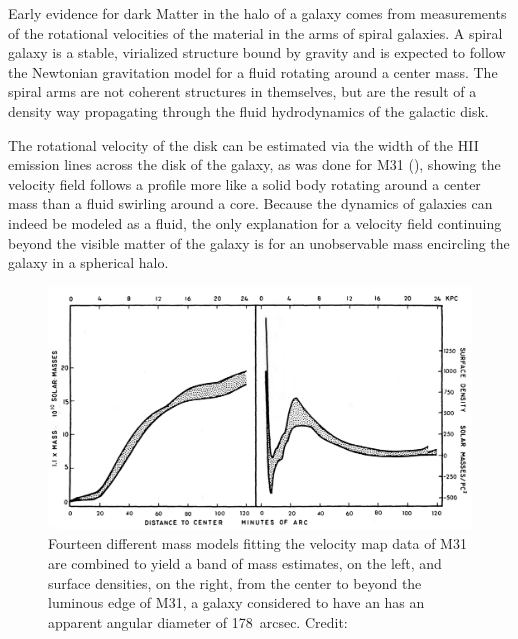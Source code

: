 \documentclass{paper}
\begin{document}
  Early evidence for dark Matter in the halo of a galaxy comes from
  measurements of the rotational velocities of the material in the arms of
  spiral galaxies. A spiral galaxy is a stable, virialized structure bound by
  gravity and is expected to follow the Newtonian gravitation model for a
  fluid rotating around a center mass. The spiral arms are not coherent
  structures in themselves, but are the result of a density way propagating 
  through the fluid hydrodynamics of the galactic disk. 

  The rotational velocity of the disk can be estimated via the 
  width of the HII emission lines across the disk of the galaxy, as was done
  for M31 (\cite{1970ApJ...159..379R}), showing the velocity field follows a 
  profile more like a solid body rotating around a center mass than a fluid 
  swirling around a core. Because the dynamics of galaxies can indeed be 
  modeled as a fluid, the only explanation for a velocity field continuing 
  beyond the visible matter of the galaxy is for an unobservable mass 
  encircling the galaxy in a spherical halo.

  \begin{figure}[H]
    \begin{centering}
    \includegraphics[scale=0.4]{DM-masscurve.pdf}
    \caption{Fourteen different mass models fitting the velocity map data of
      M31 are combined to yield a band of mass estimates, on the left, and 
      surface densities, on the right, from the center to beyond the luminous 
      edge of M31, a galaxy considered to have an has an apparent angular 
      diameter of \SI{178}{arcsec}.
      Credit: \cite{1970ApJ...159..379R}}
    \label{fig:DM-masscurve}
    \end{centering}
  \end{figure}
\end{document}
